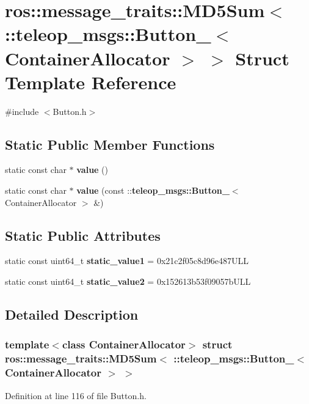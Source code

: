 \section{ros::message\_\-traits::MD5Sum$<$ ::teleop\_\-msgs::Button\_\-$<$ ContainerAllocator $>$ $>$ Struct Template Reference}
\label{structros_1_1message__traits_1_1MD5Sum_3_01_1_1teleop__msgs_1_1Button___3_01ContainerAllocator_01_4_01_4}


{\ttfamily \#include $<$Button.h$>$}

\subsection*{Static Public Member Functions}
\begin{DoxyCompactItemize}
\item 
static const char $\ast$ {\bf value} ()
\item 
static const char $\ast$ {\bf value} (const ::{\bf teleop\_\-msgs::Button\_\-}$<$ ContainerAllocator $>$ \&)
\end{DoxyCompactItemize}
\subsection*{Static Public Attributes}
\begin{DoxyCompactItemize}
\item 
static const uint64\_\-t {\bf static\_\-value1} = 0x21c2f05c8d96e487ULL
\item 
static const uint64\_\-t {\bf static\_\-value2} = 0x152613b53f09057bULL
\end{DoxyCompactItemize}


\subsection{Detailed Description}
\subsubsection*{template$<$class ContainerAllocator$>$ struct ros::message\_\-traits::MD5Sum$<$ ::teleop\_\-msgs::Button\_\-$<$ ContainerAllocator $>$ $>$}



Definition at line 116 of file Button.h.



